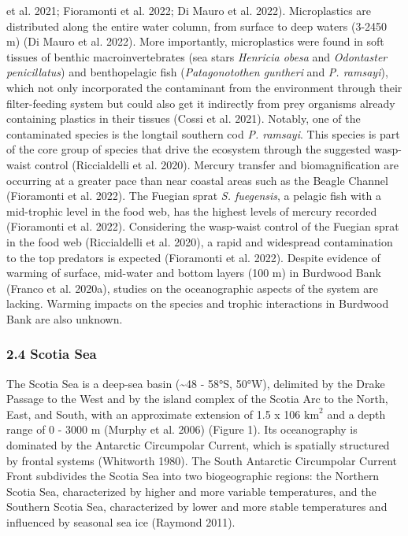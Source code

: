 \documentclass[
]{article}
\begin{document}
et al. 2021; Fioramonti et al. 2022; Di Mauro et al. 2022).
Microplastics are distributed along the entire water column, from
surface to deep waters (3-2450 m) (Di Mauro et al. 2022). More
importantly, microplastics were found in soft tissues of benthic
macroinvertebrates (sea stars \emph{Henricia obesa} and \emph{Odontaster
penicillatus}) and benthopelagic fish (\emph{Patagonotothen guntheri}
and \emph{P. ramsayi}), which not only incorporated the contaminant from
the environment through their filter-feeding system but could also get
it indirectly from prey organisms already containing plastics in their
tissues (Cossi et al. 2021). Notably, one of the contaminated species is
the longtail southern cod \emph{P. ramsayi}. This species is part of the
core group of species that drive the ecosystem through the suggested
wasp-waist control (Riccialdelli et al. 2020). Mercury transfer and
biomagnification are occurring at a greater pace than near coastal areas
such as the Beagle Channel (Fioramonti et al. 2022). The Fuegian sprat
\emph{S. fuegensis}, a pelagic fish with a mid-trophic level in the food
web, has the highest levels of mercury recorded (Fioramonti et al.
2022). Considering the wasp-waist control of the Fuegian sprat in the
food web (Riccialdelli et al. 2020), a rapid and widespread
contamination to the top predators is expected (Fioramonti et al. 2022).
Despite evidence of warming of surface, mid-water and bottom layers (100
m) in Burdwood Bank (Franco et al. 2020a), studies on the oceanographic
aspects of the system are lacking. Warming impacts on the species and
trophic interactions in Burdwood Bank are also unknown.

\subsubsection{2.4 Scotia Sea}\label{scotia-sea}

The Scotia Sea is a deep-sea basin (\textasciitilde48 - 58°S, 50°W),
delimited by the Drake Passage to the West and by the island complex of
the Scotia Arc to the North, East, and South, with an approximate
extension of 1.5 x 106 \(\text{km}^2\) and a depth range of 0 - 3000 m
(Murphy et al. 2006) (Figure 1). Its oceanography is dominated by the
Antarctic Circumpolar Current, which is spatially structured by frontal
systems (Whitworth 1980). The South Antarctic Circumpolar Current Front
subdivides the Scotia Sea into two biogeographic regions: the Northern
Scotia Sea, characterized by higher and more variable temperatures, and
the Southern Scotia Sea, characterized by lower and more stable
temperatures and influenced by seasonal sea ice (Raymond 2011).
\end{document}
